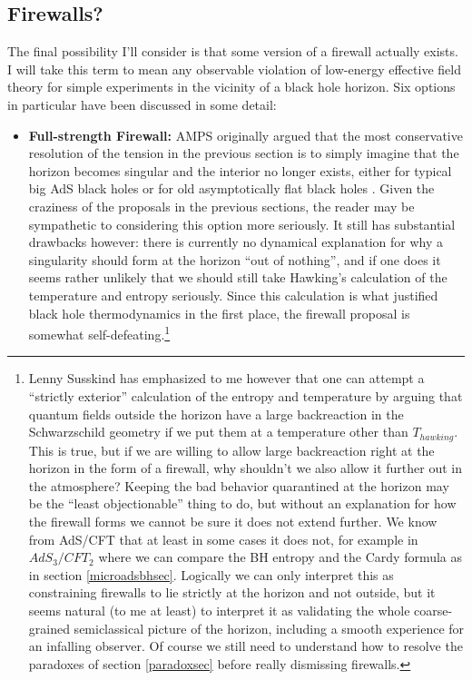 \documentclass[12pt]{article}
\begin{document}
\subsection{Firewalls?}
The final possibility I'll consider is that some version of a firewall actually exists.  I will take this term to mean any observable violation of low-energy effective field theory for simple experiments in the vicinity of a black hole horizon.  Six options in particular have been discussed in some detail:
\begin{itemize}
\item \textbf{Full-strength Firewall:} AMPS originally argued that the most conservative resolution of the tension in the previous section is to simply imagine that the horizon becomes singular and the interior no longer exists, either for typical big AdS black holes or for old asymptotically flat black holes \cite{Almheiri:2012rt,Marolf:2013dba}.  Given the craziness of the proposals in the previous sections, the reader may be sympathetic to considering this option more seriously.  It still has substantial drawbacks however: there is currently no dynamical explanation for why a singularity should form at the horizon ``out of nothing'', and if one does it seems rather unlikely that we should still take Hawking's calculation of the temperature and entropy seriously.  Since this calculation is what justified black hole thermodynamics in the first place, the firewall proposal is somewhat self-defeating.\footnote{Lenny Susskind has emphasized to me however that one can attempt a ``strictly exterior'' calculation of the entropy and temperature by arguing that quantum fields outside the horizon have a large backreaction in the Schwarzschild geometry if we put them at a temperature other than $T_{hawking}$.
This is true, but if we are willing to allow large backreaction right at the horizon in the form of a firewall, why shouldn't we also allow it further out in the atmosphere?  Keeping the bad behavior quarantined at the horizon may be the ``least objectionable'' thing to do, but without an explanation for how the firewall forms we cannot be sure it does not extend further.  We know from AdS/CFT that at least in some cases it does not, for example in $AdS_3/CFT_2$ where we can compare the BH entropy and the Cardy formula as in section \ref{microadsbhsec}.  Logically we can only interpret this as constraining firewalls to lie strictly at the horizon and not outside, but it seems natural (to me at least) to interpret it as validating the whole coarse-grained semiclassical picture of the horizon, including a smooth experience for an infalling observer.  Of course we still need to understand how to resolve the paradoxes of section \ref{paradoxsec} before really dismissing firewalls.}  

\end{itemize}
\end{document}
